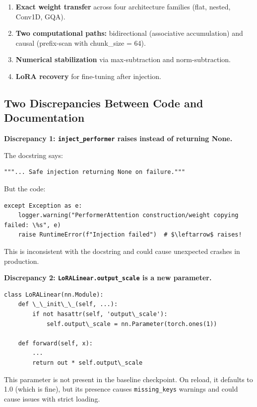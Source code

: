 \begin{enumerate}
\item \textbf{Exact weight transfer} across four architecture families (flat,
  nested, Conv1D, GQA).
\item \textbf{Two computational paths:} bidirectional (associative accumulation)
  and causal (prefix-scan with chunk\_size = 64).
\item \textbf{Numerical stabilization} via max-subtraction and norm-subtraction.
\item \textbf{LoRA recovery} for fine-tuning after injection.

\end{enumerate}
\subsection{Two Discrepancies Between Code and Documentation}

\textbf{Discrepancy 1: \texttt{inject\_performer} raises instead of returning None.}

The docstring says:

\begin{lstlisting}
"""... Safe injection returning None on failure."""
\end{lstlisting}

But the code:

\begin{lstlisting}
except Exception as e:
    logger.warning("PerformerAttention construction/weight copying failed: \%s", e)
    raise RuntimeError(f"Injection failed")  # $\leftarrow$ raises!
\end{lstlisting}

This is inconsistent with the docstring and could cause unexpected crashes 
in production.

\textbf{Discrepancy 2: \texttt{LoRALinear.output\_scale} is a new parameter.}

\begin{lstlisting}
class LoRALinear(nn.Module):
    def \_\_init\_\_(self, ...):
        if not hasattr(self, 'output\_scale'):
            self.output\_scale = nn.Parameter(torch.ones(1))
    
    def forward(self, x):
        ...
        return out * self.output\_scale
\end{lstlisting}

This parameter is not present in the baseline checkpoint. On reload, it 
defaults to 1.0 (which is fine), but its presence causes \texttt{missing\_keys} 
warnings and could cause issues with strict loading.


